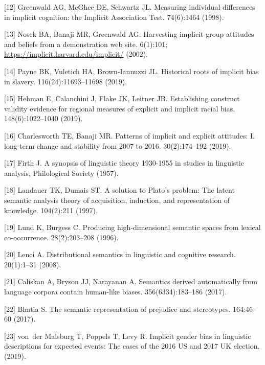 \documentclass[11pt]{wlscirep}
\begin{document}
[12] Greenwald AG, McGhee DE, Schwartz JL.  Measuring individual differences in
  implicit cognition: the {I}mplicit {A}ssociation {T}est.
 74(6):1464  (1998).

[13] Nosek BA, Banaji MR, Greenwald AG. Harvesting implicit group attitudes
  and beliefs from a demonstration web site.
 6(1):101; \url{https://implicit.harvard.edu/implicit/}  (2002). 

[14] Payne BK, Vuletich HA, Brown-Iannuzzi JL. Historical roots of implicit
  bias in slavery.
  116(24):11693--11698  (2019).

[15] Hehman E, Calanchini J, Flake JK, Leitner JB. Establishing construct
  validity evidence for regional measures of explicit and implicit racial bias.
 148(6):1022--1040  (2019).

[16]  Charlesworth TE, Banaji MR. Patterns of implicit and explicit attitudes:
  I. long-term change and stability from 2007 to 2016.
 30(2):174--192 (2019).

[17] Firth J. A synopsis of linguistic theory 1930-1955 in studies in
  linguistic analysis, {P}hilological {S}ociety (1957).

[18] Landauer TK, Dumais ST. A solution to {P}lato's problem: The latent
  semantic analysis theory of acquisition, induction, and representation of
  knowledge.
 104(2):211 (1997).

[19] Lund K, Burgess C. Producing high-dimensional semantic spaces from
  lexical co-occurrence.
  28(2):203--208  (1996).

[20] Lenci A. Distributional semantics in linguistic and cognitive research.
 20(1):1--31  (2008).

[21] Caliskan A, Bryson JJ, Narayanan A. Semantics derived automatically from
  language corpora contain human-like biases.
 356(6334):183--186 (2017).

[22] Bhatia S. The semantic representation of prejudice and stereotypes.
 164:46--60 (2017).

[23] von~der Malsburg T, Poppels T, Levy R. Implicit gender bias in linguistic
  descriptions for expected events: The cases of the 2016 {US} and 2017 {UK}
  election.
 (2019).
\end{document}

